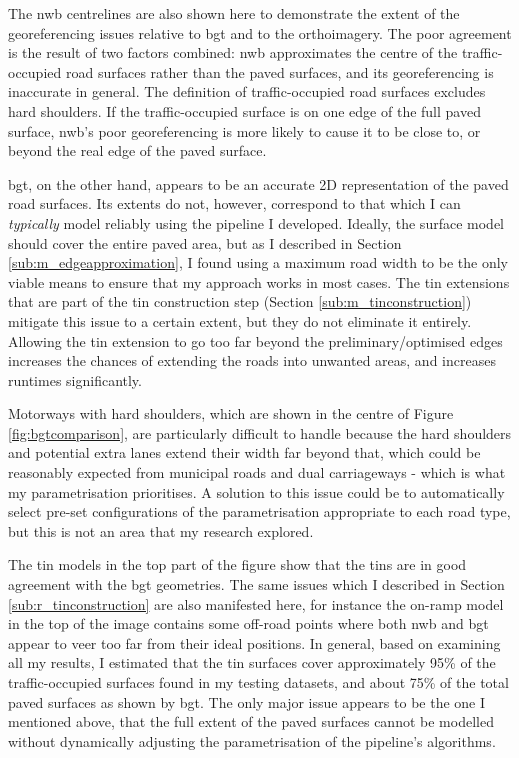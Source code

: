 The \ac{nwb} centrelines are also shown here to demonstrate the extent of the georeferencing issues relative to \ac{bgt} and to the orthoimagery. The poor agreement is the result of two factors combined: \ac{nwb} approximates the centre of the traffic-occupied road surfaces rather than the paved surfaces, and its georeferencing is inaccurate in general. The definition of traffic-occupied road surfaces excludes hard shoulders. If the traffic-occupied surface is on one edge of the full paved surface, \ac{nwb}'s poor georeferencing is more likely to cause it to be close to, or beyond the real edge of the paved surface.

\ac{bgt}, on the other hand, appears to be an accurate 2D representation of the paved road surfaces. Its extents do not, however, correspond to that which I can \textit{typically} model reliably using the pipeline I developed. Ideally, the surface model should cover the entire paved area, but as I described in Section \ref{sub:m_edgeapproximation}, I found using a maximum road width to be the only viable means to ensure that my approach works in most cases. The \ac{tin} extensions that are part of the \ac{tin} construction step (Section \ref{sub:m_tinconstruction}) mitigate this issue to a certain extent, but they do not eliminate it entirely. Allowing the \ac{tin} extension to go too far beyond the preliminary/optimised edges increases the chances of extending the roads into unwanted areas, and increases runtimes significantly.

Motorways with hard shoulders, which are shown in the centre of Figure \ref{fig:bgtcomparison}, are particularly difficult to handle because the hard shoulders and potential extra lanes extend their width far beyond that, which could be reasonably expected from municipal roads and dual carriageways - which is what my parametrisation prioritises. A solution to this issue could be to automatically select pre-set configurations of the parametrisation appropriate to each road type, but this is not an area that my research explored.

The \ac{tin} models in the top part of the figure show that the \ac{tin}s are in good agreement with the \ac{bgt} geometries. The same issues which I described in Section \ref{sub:r_tinconstruction} are also manifested here, for instance the on-ramp model in the top of the image contains some off-road points where both \ac{nwb} and \ac{bgt} appear to veer too far from their ideal positions. In general, based on examining all my results, I estimated that the \ac{tin} surfaces cover approximately 95\% of the traffic-occupied surfaces found in my testing datasets, and about 75\% of the total paved surfaces as shown by \ac{bgt}. The only major issue appears to be the one I mentioned above, that the full extent of the paved surfaces cannot be modelled without dynamically adjusting the parametrisation of the pipeline's algorithms.


